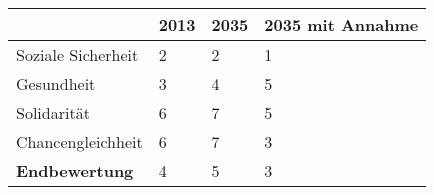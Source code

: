 \begin{table}[h]
    \centering
    \begin{tabular}{l|lll} & \textbf{2013} & \textbf{2035} &  \textbf{2035 mit Annahme} 
        \\ \hline Soziale Sicherheit    & 2  & 2  & 1
        \\ Gesundheit                   & 3  & 4  & 5
        \\ Solidarität                  & 6  & 7  & 5
        \\ Chancengleichheit            & 6  & 7  & 3
        \\ \hline \textbf{Endbewertung} & 4  & 5  & 3
    \end{tabular}
\end{table}
